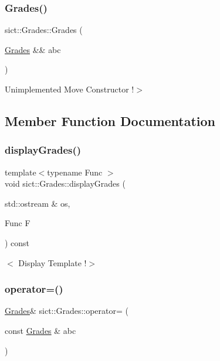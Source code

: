 \subsubsection{\texorpdfstring{Grades()}{Grades()}\hspace{0.1cm}{\footnotesize\ttfamily [4/4]}}
{\footnotesize\ttfamily sict\+::\+Grades\+::\+Grades (\begin{DoxyParamCaption}\item[{\mbox{\hyperlink{classsict_1_1_grades}{Grades}} \&\&}]{abc }\end{DoxyParamCaption})\hspace{0.3cm}{\ttfamily [delete]}}

Unimplemented Move Constructor !$>$ 

\subsection{Member Function Documentation}
\mbox{\label{classsict_1_1_grades_ad0af43fb31cb2968265c90f050377f03}} 
\subsubsection{\texorpdfstring{display\+Grades()}{displayGrades()}}
{\footnotesize\ttfamily template$<$typename Func $>$ \\
void sict\+::\+Grades\+::display\+Grades (\begin{DoxyParamCaption}\item[{std\+::ostream \&}]{os,  }\item[{Func}]{F }\end{DoxyParamCaption}) const\hspace{0.3cm}{\ttfamily [inline]}}

$<$ Display Template !$>$ \mbox{\label{classsict_1_1_grades_a7fc6251e877862c21863740326a6bbd0}} 
\subsubsection{\texorpdfstring{operator=()}{operator=()}\hspace{0.1cm}{\footnotesize\ttfamily [1/2]}}
{\footnotesize\ttfamily \mbox{\hyperlink{classsict_1_1_grades}{Grades}}\& sict\+::\+Grades\+::operator= (\begin{DoxyParamCaption}\item[{const \mbox{\hyperlink{classsict_1_1_grades}{Grades}} \&}]{abc }\end{DoxyParamCaption})\hspace{0.3cm}{\ttfamily [delete]}}

